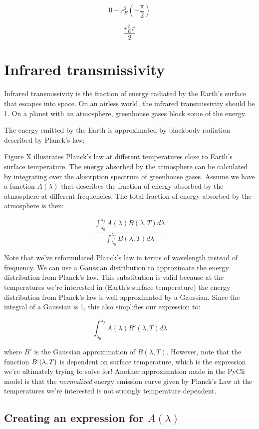 \documentclass[12pt]{article} %
\begin{document}
$$0 -  r_{E}^2 (-\frac{\pi}{2})$$

$$\frac{r_{E}^2 \pi}{2}$$

\section{Infrared transmissivity}

Infrared transmissivity is the fraction of energy radiated by the Earth's surface that escapes into space. On an airless world, the infrared transmissivity should be 1. On a planet with an atmosphere, greenhouse gases block some of the energy.

The energy emitted by the Earth is approximated by blackbody radiation described by Planck's law:

Figure X illustrates Planck's law at different temperatures close to Earth's surface temperature. The energy absorbed by the atmosphere can be calculated by integrating over the absorption spectrum of greenhouse gases. Assume we have a function $A(\lambda)$ that describes the fraction of energy absorbed by the atmosphere at different frequencies. The total fraction of energy absorbed by the atmosphere is then:

$$\frac{\int_{\lambda_0}^{\lambda_f} A(\lambda) B(\lambda, T) d\lambda}{\int_{\lambda_0}^{\lambda_f} B(\lambda, T) d\lambda }$$

Note that we've reformulated Planck's law in terms of wavelength instead of frequency. We can use a Gaussian distribution to approximate the energy distribution from Planck's law. This substitution is valid because at the temperatures we're interested in (Earth's surface temperature) the energy distribution from Planck's law is well approximated by a Gaussian. Since the integral of a Gaussian is 1, this also simplifies our expression to:

$$\int_{\lambda_0}^{\lambda_f} A(\lambda) B'(\lambda, T) d\lambda$$

where $B'$ is the Gaussian approximation of $B(\lambda, T)$. However, note that the function $B`(\lambda, T)$ is dependent on surface temperature, which is the expression we're ultimately trying to solve for! Another approximation made in the PyCli model is that the \textit{normalized} energy emission curve given by Planck's Law at the temperatures we're interested is not strongly temperature dependent.

\subsection{Creating an expression for $A(\lambda)$}
\end{document}

